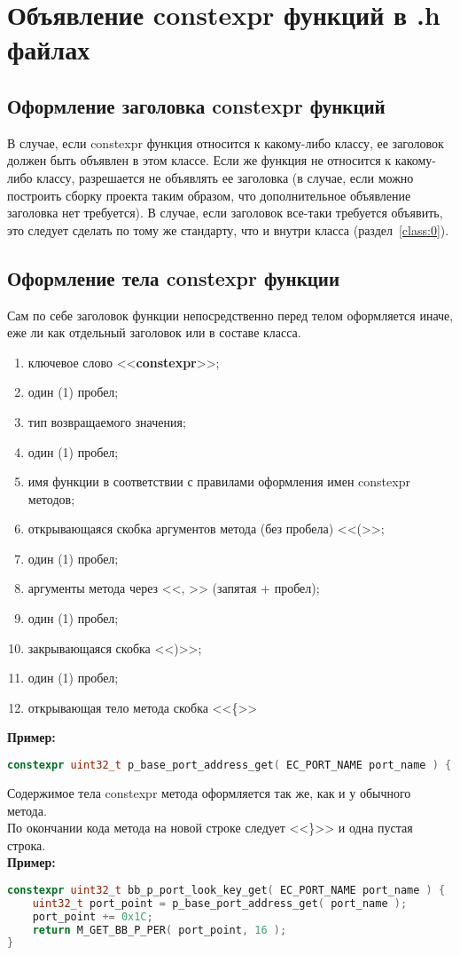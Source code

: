 \chapter{Объявление constexpr функций в .h файлах}\label{const:func}
\section{Оформление заголовка constexpr функций}
В случае, если constexpr функция относится к какому-либо классу, ее заголовок должен быть объявлен в этом классе. Если же функция не относится к какому-либо классу, разрешается не объявлять ее заголовка (в случае, если можно построить сборку проекта таким образом, что дополнительное объявление заголовка нет требуется). В случае, если заголовок все-таки требуется объявить, это следует сделать по тому же стандарту, что и внутри класса (раздел~\ref{class:0}).

\section{Оформление тела constexpr функции}
Сам по себе заголовок функции непосредственно перед телом оформляется иначе, еже ли как отдельный заголовок или в составе класса.
\begin{enumerate}
	\item ключевое слово <<\textbf{constexpr}>>;
	\item один (1) пробел;
	\item тип возвращаемого значения;
	\item один (1) пробел;
	\item имя функции в соответствии с правилами оформления имен constexpr методов;
	\item открывающаяся скобка аргументов метода (без пробела) <<(>>;
	\item один (1) пробел;
	\item аргументы метода через <<, >> (запятая + пробел);
	\item один (1) пробел;
	\item закрывающаяся скобка <<)>>;
	\item один (1) пробел;
	\item открывающая тело метода скобка <<\{>>
\end{enumerate}
\textbf{Пример:}\begin{lstlisting}[language=C++, frame=tlBR, basicstyle=\fontsize{10}{10}\ttfamily]
constexpr uint32_t p_base_port_address_get( EC_PORT_NAME port_name ) {\end{lstlisting}
Содержимое тела constexpr метода оформляется так же, как и у обычного метода.\\По окончании кода метода на новой строке следует <<\}>> и одна пустая строка.
\\\textbf{Пример:}\begin{lstlisting}[language=C++, frame=tlBR, basicstyle=\fontsize{10}{10}\ttfamily]
constexpr uint32_t bb_p_port_look_key_get( EC_PORT_NAME port_name ) {
	uint32_t port_point = p_base_port_address_get( port_name ); 
	port_point += 0x1C;                                         
	return M_GET_BB_P_PER( port_point, 16 );                    
}
 \end{lstlisting}
